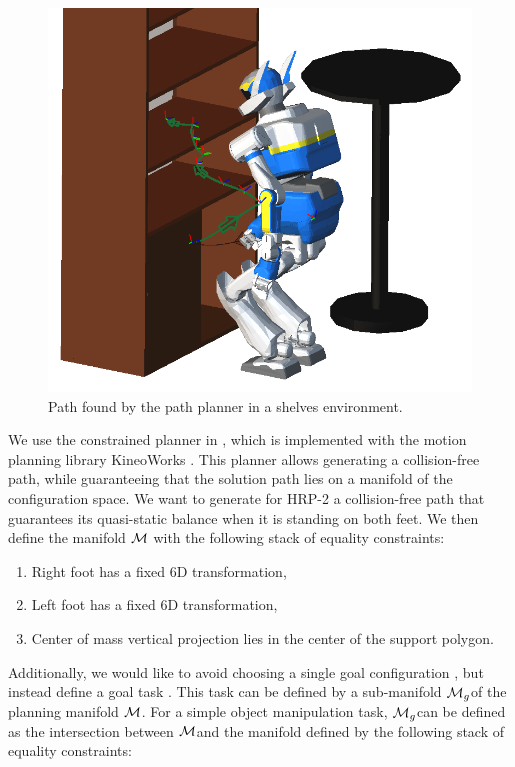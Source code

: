 \begin{figure}
\centering
\includegraphics[width=0.8\linewidth]
                {src/chap3-optimal-motion-planning/figure/shelves-path.png}
\caption{Path found by the path planner in a shelves environment.}
\label{path}
\end{figure}

We use the constrained planner in \cite{dali09}, which is
implemented with the motion planning library KineoWorks\texttrademark
\cite{Laumond2006}. This planner allows generating a collision-free
path, while guaranteeing that the solution path lies on a manifold of
the configuration space. We want to generate for HRP-2 a
collision-free path that guarantees its quasi-static balance when it
is standing on both feet. We then define the manifold $\mathcal{M}$
with the following stack of equality constraints:

\begin{enumerate}
  \item Right foot has a fixed 6D transformation,
  \item Left foot has a fixed 6D transformation,
  \item Center of mass vertical projection lies in the center of the
    support polygon.
\end{enumerate}

Additionally, we would like to avoid choosing a single goal
configuration , but instead define a goal task
. This task can be defined by a sub-manifold
$\mathcal{M}_{g}$\thinspace of the planning manifold $\mathcal{M}$. For a
simple object manipulation task, $\mathcal{M}_{g}$\thinspace can be
defined as the intersection between $\mathcal{M}$\thinspace and the
manifold defined by the following stack of equality constraints:

